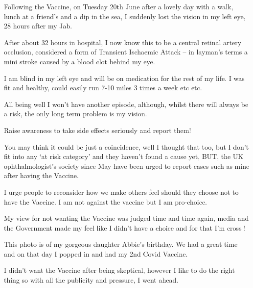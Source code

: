 Following the Vaccine, on Tuesday 20th June after a lovely day with a walk,
lunch at a friend’s and a dip in the sea, I suddenly lost the vision in my left
eye, 28 hours after my Jab.

After about 32 hours in hospital, I now know this to be a central retinal artery
occlusion, considered a form of Transient Ischaemic Attack – in layman’s terms a
mini stroke caused by a blood clot behind my eye.

I am blind in my left eye and will be on medication for the rest of my life. I
was fit and healthy, could easily run 7-10 miles 3 times a week etc etc.

All being well I won’t have another episode, although, whilst there will always
be a risk, the only long term problem is my vision.

Raise awareness to take side effects seriously and report them!

You may think it could be just a coincidence, well I thought that too, but I
don’t fit into any ‘at risk category’ and they haven’t found a cause yet, BUT,
the UK ophthalmologist’s society since May have been urged to report cases such
as mine after having the Vaccine.

I urge people to reconsider how we make others feel should they choose not to
have the Vaccine. I am not against the vaccine but I am pro-choice.

My view for not wanting the Vaccine was judged time and time again, media and
the Government made my feel like I didn’t have a choice and for that I’m cross !

This photo is of my gorgeous daughter Abbie’s birthday. We had a great time and
on that day I popped in and had my 2nd Covid Vaccine.

I didn’t want the Vaccine after being skeptical, however I like to do the right
thing so with all the publicity and pressure, I went ahead.


